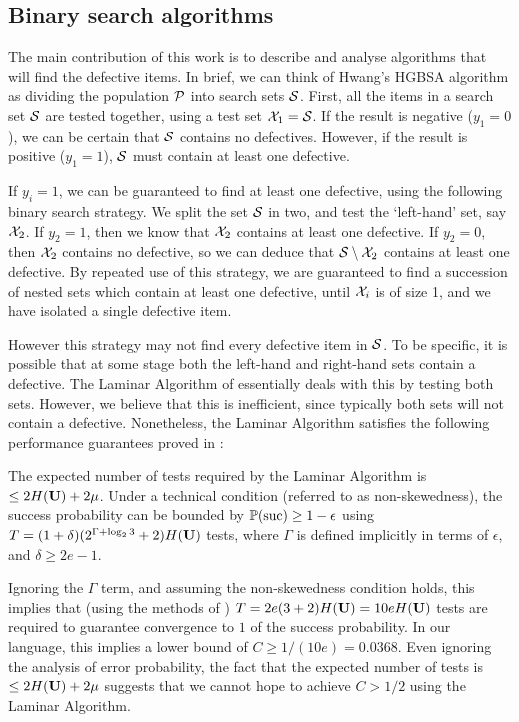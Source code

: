 \subsection{Binary search algorithms}

The main contribution of this work is  to describe and analyse algorithms that will find the defective items.
In brief, we can think of Hwang's HGBSA algorithm as dividing the population ${\mathcal{P}}$ into search sets ${\mathcal{S}}$. First, all the items in a search set ${\mathcal{S}}$ are tested together,
using a test set ${\mathcal{X}}_1 = {\mathcal{S}}$. If the result is negative
($y_1 = 0$), we can be certain that ${\mathcal{S}}$ contains no defectives. However, if the result is positive ($y_1 = 1$),  ${\mathcal{S}}$ must contain at least one defective.

If $y_i = 1$, we can be guaranteed to find at least
one defective, using the following binary search strategy.  
We  split the   set ${\mathcal{S}}$ in two, and test the `left-hand' set, say ${\mathcal{X}}_{2}$. If $y_{2} = 1$, then we know that ${\mathcal{X}}_{2}$ contains at least one defective.
If $y_{2} = 0$, then ${\mathcal{X}}_{2}$ contains no defective, so we can deduce that ${\mathcal{S}} \setminus {\mathcal{X}}_2$ contains at least one defective. By repeated use of this strategy, we are 
guaranteed to find a succession of nested sets which contain at least one defective, until ${\mathcal{X}}_i$ is of size 1, and we have isolated a single defective item.

However this strategy may not find every defective item in ${\mathcal{S}}$. To be specific, it is possible that at some stage
both the left-hand and right-hand sets contain a defective. The Laminar Algorithm of \cite{li5} essentially deals with this by testing 
both sets. However, we believe that this is inefficient, since typically both sets will not contain a defective. Nonetheless, the Laminar Algorithm satisfies
 the following  performance guarantees  proved in \cite[Theorem 2]{li5}: 
%
\begin{theorem} \label{thm:lower}
The expected number of tests required by the Laminar Algorithm \cite{li5}  is $\leq 2 H({\mathbf{ U}}) + 2 \mu$. Under a technical condition (referred to as non-skewedness), the
success probability can be bounded by ${\mathbb{P}}({\rm suc}) \geq 1- \epsilon$ using $T = (1+ \delta) (2^{\Gamma + \log_2 3} + 2) H({\mathbf{ U}})$ tests, where $\Gamma$ is defined implicitly
in terms of $\epsilon$, and $\delta \geq 2 e - 1$.
\end{theorem}

Ignoring the $\Gamma$ term, and assuming the non-skewedness condition holds,
 this implies that (using the methods of \cite{li5}) $T =  2 e (3 + 2) H({\mathbf{ U}}) = 10 e H({\mathbf{ U}})$ tests are required to guarantee convergence to $1$
of the success probability. In our language, this implies a lower bound of $C \geq 1/(10 e) = 0.0368$. Even ignoring the analysis of error probability, the fact that the expected number
of tests is $\leq 2 H({\mathbf{ U}}) + 2 \mu$ suggests that we cannot hope to achieve $C > 1/2$ using the Laminar Algorithm.
%
